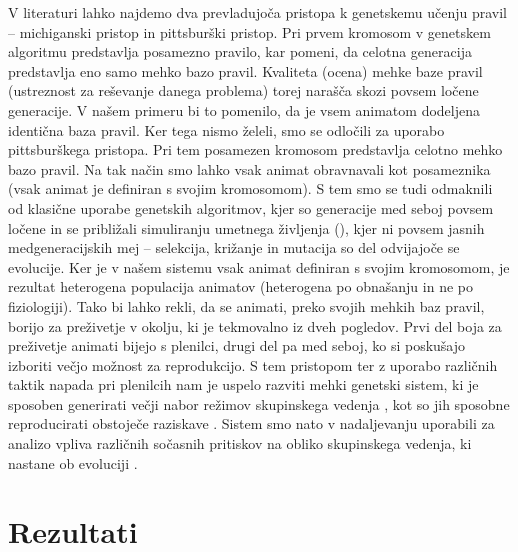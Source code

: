 \begin{razsirjeniPovzetek}
V literaturi lahko najdemo dva prevladujoča pristopa k genetskemu učenju pravil -- michiganski pristop \cite{holland1977cognitive} in pittsburški \cite{smith1980learning} pristop. Pri prvem kromosom v genetskem algoritmu predstavlja posamezno pravilo, kar pomeni, da celotna generacija predstavlja eno samo mehko bazo pravil. Kvaliteta (ocena) mehke baze pravil (ustreznost za reševanje danega problema) torej narašča skozi povsem ločene generacije. V našem primeru bi to pomenilo, da je vsem animatom dodeljena identična baza pravil. Ker tega nismo želeli, smo se odločili za uporabo pittsburškega pristopa. Pri tem posamezen kromosom predstavlja celotno mehko bazo pravil. Na tak način smo lahko vsak animat obravnavali kot posameznika (vsak animat je definiran s svojim kromosomom). S tem smo se tudi odmaknili od klasične uporabe genetskih algoritmov, kjer so generacije med seboj povsem ločene in se približali simuliranju umetnega življenja (), kjer ni povsem jasnih medgeneracijskih mej -- selekcija, križanje in mutacija so del odvijajoče se evolucije. Ker je v našem sistemu vsak animat definiran s svojim kromosomom, je rezultat heterogena populacija animatov (heterogena po obnašanju in ne po fiziologiji). Tako bi lahko rekli, da se animati, preko svojih mehkih baz pravil, borijo za preživetje v okolju, ki je tekmovalno iz dveh pogledov. Prvi del boja za preživetje animati bijejo s plenilci, drugi del pa med seboj, ko si poskušajo izboriti večjo možnost za reprodukcijo. S tem pristopom ter z uporabo različnih taktik napada pri plenilcih nam je uspelo razviti mehki genetski sistem, ki je sposoben generirati večji nabor režimov skupinskega vedenja \cite{demsar2017evolution}, kot so jih sposobne reproducirati obstoječe raziskave \cite{biswas2014causes,hein2015evolution,olson2013predator,olson2015exploring,olson2016evolution,reynolds1993evolved,sayers2009evolved,spector2003emergence,wood2007evolving}. Sistem smo nato v nadaljevanju uporabili za analizo vpliva različnih sočasnih pritiskov na obliko skupinskega vedenja, ki nastane ob evoluciji \cite{demsar2016balanced}.

\section{Rezultati}


\end{razsirjeniPovzetek}
